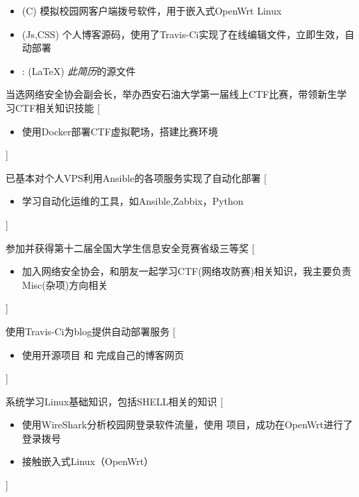 \documentclass[zh]{resume}
\begin{document}
\begin{itemize}
  \item {}
  (C)
  模拟校园网客户端拨号软件，用于嵌入式OpenWrt Linux
  \item {}
  (Js,CSS)
  个人博客源码，使用了Travis-Ci实现了在线编辑文件，立即生效，自动部署
  \item {}:
    (\LaTeX)
    \emph{此简历}的源文件
\end{itemize}


\begin{experiences}
  {当选网络安全协会副会长，举办西安石油大学第一届线上CTF比赛，带领新生学习CTF相关知识技能}%
  [\begin{itemize}
    \item 使用Docker部署CTF虚拟靶场，搭建比赛环境
  \end{itemize}
  ]

  \separator{0.5ex}
  {已基本对个人VPS利用Ansible的各项服务实现了自动化部署 }%
  [\begin{itemize}
    \item 学习自动化运维的工具，如Ansible,Zabbix，Python
  \end{itemize}
  ]
  
  \separator{0.5ex}
  {参加并获得第十二届全国大学生信息安全竞赛省级三等奖}%
  [\begin{itemize}
    \item 加入网络安全协会，和朋友一起学习CTF(网络攻防赛)相关知识，我主要负责Misc(杂项)方向相关
  \end{itemize}
  ]

  \separator{0.5ex}
    {使用Travis-Ci为blog提供自动部署服务}%
    [\begin{itemize}
      \item 使用开源项目  和  
      完成自己的博客网页
    \end{itemize}]

  \separator{0.5ex}

    {系统学习Linux基础知识，包括SHELL相关的知识}%
    [\begin{itemize}
      \item 使用WireShark分析校园网登录软件流量，使用  项目，成功在OpenWrt进行了登录拨号
      \item 接触嵌入式Linux（OpenWrt）
    \end{itemize}]
\end{experiences}
\end{document}
